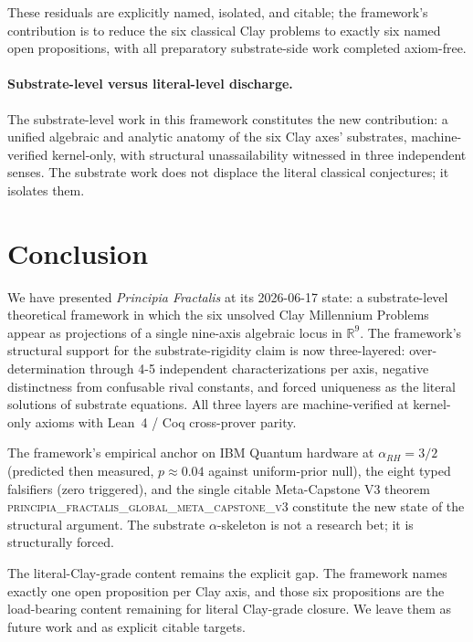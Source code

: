 \documentclass[11pt,a4paper]{amsart}
\theoremstyle{plain}
\theoremstyle{definition}
\newcommand{\Rl}{\mathbb{R}}
\newcommand{\aRH}{\alpha_{RH}}
\begin{document}
These residuals are explicitly named, isolated, and citable; the
framework's contribution is to reduce the six classical Clay problems
to exactly six named open propositions, with all preparatory
substrate-side work completed axiom-free.

\paragraph{Substrate-level versus literal-level discharge.}
The substrate-level work in this framework constitutes the new
contribution: a unified algebraic and analytic anatomy of the six
Clay axes' substrates, machine-verified kernel-only, with structural
unassailability witnessed in three independent senses. The substrate
work does not displace the literal classical conjectures; it
isolates them.

\section{Conclusion}
\label{sec:conclusion}

We have presented \emph{Principia Fractalis} at its 2026-06-17
state: a substrate-level theoretical framework in which the six
unsolved Clay Millennium Problems appear as projections of a single
nine-axis algebraic locus in $\Rl^{9}$. The framework's structural
support for the substrate-rigidity claim is now three-layered:
over-determination through 4-5 independent characterizations per
axis, negative distinctness from confusable rival constants, and
forced uniqueness as the literal solutions of substrate equations.
All three layers are machine-verified at kernel-only axioms with
Lean~4 / Coq cross-prover parity.

The framework's empirical anchor on IBM Quantum hardware at
$\aRH = 3/2$ (predicted then measured, $p \approx 0.04$ against
uniform-prior null), the eight typed falsifiers (zero triggered),
and the single citable
Meta-Capstone V3 theorem
\textsc{principia\_fractalis\_global\_meta\_capstone\_v3}
constitute the new state of the structural argument. The substrate
$\alpha$-skeleton is not a research bet; it is structurally forced.

The literal-Clay-grade content remains the explicit gap. The
framework names exactly one open proposition per Clay axis, and
those six propositions are the load-bearing content remaining for
literal Clay-grade closure. We leave them as future work and as
explicit citable targets.
\end{document}
